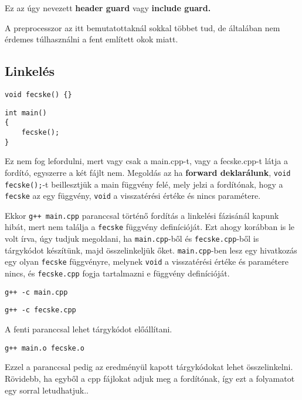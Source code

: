\documentclass[a4paper,11.5pt]{article}
\begin{document}
	Ez az úgy nevezett \textbf{header guard} vagy \textbf{include guard.}
	
	\medskip
	A preprocesszor az itt bemutatottaknál sokkal többet tud, de általában nem érdemes túlhasználni a fent említett okok miatt.
	
	\subsection{Linkelés}
	\bigskip
	
	\begin{lstlisting}
void fecske() {}
	\end{lstlisting}
	\bigskip
	
	\begin{lstlisting}
int main()
{
	fecske();
}
	\end{lstlisting}
		
	Ez nem fog lefordulni, mert vagy csak a main.cpp-t, vagy a fecske.cpp-t látja a fordító, egyszerre a két fájlt nem. Megoldás az ha \textbf{forward deklarálunk}, \texttt{void fecske();}-t beillesztjük a main függvény felé, mely jelzi a fordítónak, hogy a \texttt{fecske} az egy függvény, \texttt{void} a visszatérési értéke és nincs paramétere. 
	\medskip
	
	Ekkor \texttt{g++ main.cpp} paranccsal történő fordítás a linkelési fázisánál kapunk hibát, mert nem találja a \texttt{fecske} függvény definícióját. Ezt ahogy korábban is le volt írva, úgy tudjuk megoldani, ha \texttt{main.cpp}-ből és \texttt{fecske.cpp}-ből is tárgykódot készítünk, majd összelinkeljük őket. \texttt{main.cpp}-ben lesz egy hivatkozás egy olyan \texttt{fecske} függvényre, melynek \texttt{void} a visszatérési értéke és paramétere nincs, és \texttt{fecske.cpp} fogja tartalmazni e függvény definícióját. 
		
    {\centering\texttt{g++ -c main.cpp}\par}

	{\centering\texttt{g++ -c fecske.cpp}\par}

	A fenti paranccsal lehet tárgykódot előállítani.
	
	{\centering\texttt{g++ main.o fecske.o}\par}
	
	Ezzel a paranccsal pedig az eredményül kapott tárgykódokat lehet összelinkelni. Rövidebb, ha egyből a cpp fájlokat adjuk meg a fordítónak, így ezt a folyamatot egy sorral letudhatjuk..
\end{document}
